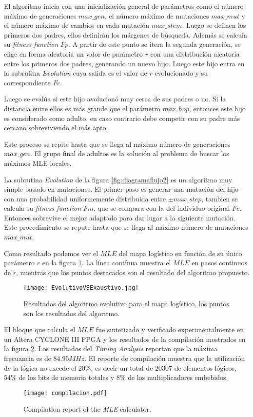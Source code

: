 El algoritmo inicia con una inicialización general de parámetros como el número máximo de generaciones $max\_gen$, el número máximo de mutaciones $max\_mut$ y el número máximo de cambios en cada mutación $max\_stem$.
Luego se definen los primeros dos padres, ellos definirán los márgenes de búsqueda.
Además se calcula su \textit{fitness function} $Fp$.
A partir de este punto se itera la segunda generación, se elige en forma aleatoria un valor de parámetro $r$ con una distribución aleatoria entre los primeros dos padres, generando un nuevo hijo.
Luego este hijo entra en la subrutina \textit{Evolution} cuya salida es el valor de $r$ evolucionado y su correspondiente $Fc$.

Luego se evalúa si este hijo avolucionó muy cerca de sus padres o no.
Si la distancia entre ellos es más grande que el parámetro $max\_hop$, entonces este hijo es considerado como adulto, en caso contrario debe competir con su padre más cercano sobreviviendo el más apto.

Este proceso se repite hasta que se llega al máximo número de  generaciones $max\_gen$.
El grupo final de adultos es la solución al problema de buscar los máximos MLE locales.

La subrutina \textit{Evolution} de la figura \ref{fig:diagramaflujo2} es un algoritmo muy simple basado en mutaciones.
El primer paso es generar una mutación del hijo con una probabilidad uniformemente distribuida entre $\pm max\_step$, tambien se calcula su \textit{fitness function} $Fm$, que se compara con la del individuo original $Fc$.
Entonces sobrevive el mejor adaptado para dar lugar a la siguiente mutación.
Este procedimiento se repute hasta que se llega al máximo número de mutaciones $max\_mut$.

Como resultado podemos ver el $MLE$ del mapa logístico en función de su único parámetro $r$ en la figura \ref{fig:resultadoAlgorithm}.
La línea contínua muestra el $MLE$ en pasos continuos de $r$, mientras que los puntos destacados son el resultado del algoritmo propuesto.
%
\begin{figure}
	\centering
	\texttt{[image: EvolutivoVSExaustivo.jpg]}\\
	\caption{Resultados del algoritmo evolutivo para el mapa logístico, los puntos son los resultados del algoritmo.}\label{fig:resultadoAlgorithm}
\end{figure}

El bloque que calcula el $MLE$ fue sintetizado y verificado experimentalmente en un Altera CYCLONE III FPGA y los resultados de la compilación mostrados en la figura \ref{fig:compilacion}.
Los resultados del \textit{Timing Analysis} reportan que la máxima frecuancia es de $84.95MHz$.
El reporte de compilación muestra que la utilización de la lógica no excede el $20\%$, es decir un total de $20307$ de elementos lógicos, $54\%$ de los bits de memoria totales y $8\%$ de los multiplicadores embebidos.
%
\begin{figure}
	\centering
	\texttt{[image: compilacion.pdf]}\\
	\caption{Compilation report of the \textit{MLE} calculator.}\label{fig:compilacion}
\end{figure}

